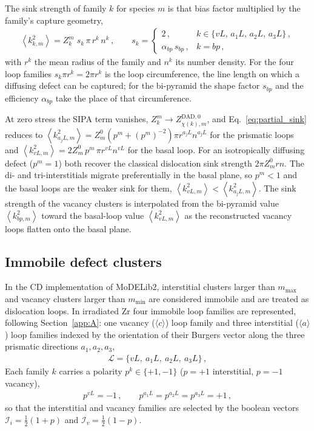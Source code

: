 \documentclass{article}
\begin{document}
The sink strength of family $k$ for species $m$ is that bias factor multiplied by the family's capture geometry,
\begin{align}\label{eq:partial_sink}
\left\langle k^2_{k,m}\right\rangle = Z^m_k\; s_k\,\pi\, r^{k}\, n^{k}\, ,
\qquad
s_k=\begin{cases}
2\, , & k\in\{vL,\,a_1L,\,a_2L,\,a_3L\}\, ,\\[2pt]
\alpha_{bp}\,s_{bp}\, , & k=bp\, ,
\end{cases}
\end{align}
with $r^{k}$ the mean radius of the family and $n^{k}$ its number density. For the four loop families $s_k\pi r^{k}=2\pi r^{k}$ is the loop circumference, the line length on which a diffusing defect can be captured; for the bi-pyramid the shape factor $s_{bp}$ and the efficiency $\alpha_{bp}$ take the place of that circumference.

At zero stress the SIPA term vanishes, $Z^m_k\to Z^{\mathrm{DAD},0}_{\chi(k),m}$, and Eq.~\eqref{eq:partial_sink} reduces to $\left\langle k^2_{a_jL,m}\right\rangle=Z^0_m\left(p^m+(p^m)^{-2}\right)\pi r^{a_jL} n^{a_jL}$ for the prismatic loops and $\left\langle k^2_{vL,m}\right\rangle=2Z^0_m\,p^m\,\pi r^{vL} n^{vL}$ for the basal loop. For an isotropically diffusing defect ($p^m=1$) both recover the classical dislocation sink strength $2\pi Z^0_m r n$. The di- and tri-interstitials migrate preferentially in the basal plane, so $p^m<1$ and the basal loops are the weaker sink for them, $\left\langle k^2_{vL,m}\right\rangle<\left\langle k^2_{a_jL,m}\right\rangle$. The sink strength of the vacancy clusters is interpolated from the bi-pyramid value $\left\langle k^2_{bp,m}\right\rangle$ toward the basal-loop value $\left\langle k^2_{vL,m}\right\rangle$ as the reconstructed vacancy loops flatten onto the basal plane.




\subsection{Immobile defect clusters}
\label{sec:immobileClusters}

In the CD implementation of MoDELib2, interstitial clusters larger than $m_\text{max}$ and vacancy clusters larger than $m_\text{min}$ are considered immobile and are treated as dislocation loops. In irradiated Zr four immobile loop families are represented, following Section~\ref{app:A}: one vacancy ($\langle c\rangle$) loop family and three interstitial ($\langle a\rangle$) loop families indexed by the orientation of their Burgers vector along the three prismatic directions $a_1,a_2,a_3$,
\begin{align}
\mathcal{L}=\{vL,\ a_1L,\ a_2L,\ a_3L\}\, ,
\end{align}
Each family $k$ carries a polarity $p^k\in\{+1,-1\}$ ($p=+1$ interstitial, $p=-1$ vacancy),
\begin{align}
p^{vL}=-1\, ,\qquad p^{a_1L}=p^{a_2L}=p^{a_3L}=+1\, ,
\end{align}
so that the interstitial and vacancy families are selected by the boolean vectors $\mathcal{I}_i=\tfrac12(1+p)$ and $\mathcal{I}_v=\tfrac12(1-p)$.
\end{document}
